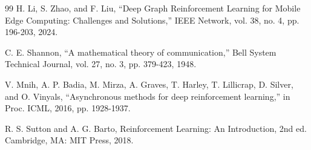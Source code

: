 \documentclass[10pt,twocolumn]{article}
\begin{document}
\begin{thebibliography}{99}
	 H. Li, S. Zhao, and F. Liu, ``Deep Graph Reinforcement Learning for Mobile Edge Computing: Challenges and Solutions,'' IEEE Network, vol. 38, no. 4, pp. 196-203, 2024.

	 C. E. Shannon, ``A mathematical theory of communication,'' Bell System Technical Journal, vol. 27, no. 3, pp. 379-423, 1948.

	 V. Mnih, A. P. Badia, M. Mirza, A. Graves, T. Harley, T. Lillicrap, D. Silver, and O. Vinyals, ``Asynchronous methods for deep reinforcement learning,'' in Proc. ICML, 2016, pp. 1928-1937.

	 R. S. Sutton and A. G. Barto, Reinforcement Learning: An Introduction, 2nd ed. Cambridge, MA: MIT Press, 2018.

\end{thebibliography}
\end{document}
